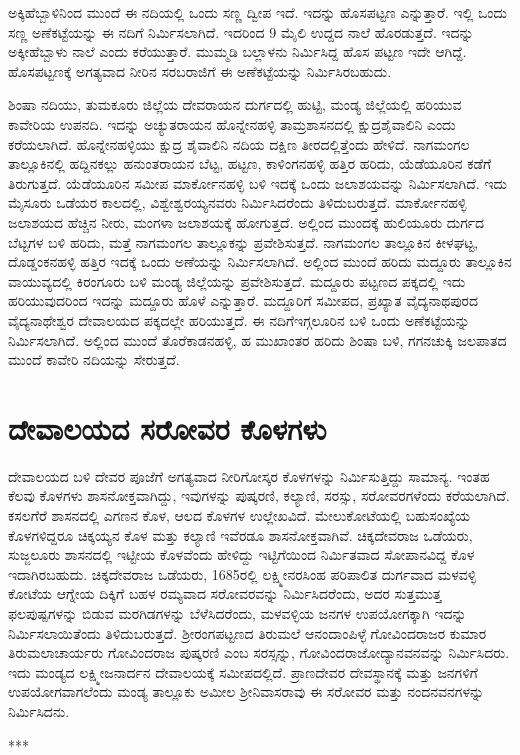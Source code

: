 ಅಕ್ಕಿಹೆಬ್ಬಾಳಿನಿಂದ ಮುಂದೆ ಈ ನದಿಯಲ್ಲಿ ಒಂದು ಸಣ್ಣ ದ್ವೀಪ ಇದೆ. ಇದನ್ನು ಹೊಸಪಟ್ಟಣ ಎನ್ನುತ್ತಾರೆ. ಇಲ್ಲಿ ಒಂದು ಸಣ್ಣ ಅಣೆಕಟ್ಟೆಯನ್ನು ಈ ನದಿಗೆ ನಿರ್ಮಿಸಲಾಗಿದೆ. ಇದರಿಂದ 9 ಮೈಲಿ ಉದ್ದದ ನಾಲೆ ಹೊರಡುತ್ತದೆ. ಇದನ್ನು ಅಕ್ಕೀಹೆಬ್ಬಾಳು ನಾಲೆ ಎಂದು ಕರೆಯುತ್ತಾರೆ. ಮುಮ್ಮಡಿ ಬಲ್ಲಾಳನು ನಿರ್ಮಿಸಿದ್ದ ಹೊಸ ಪಟ್ಟಣ ಇದೇ ಆಗಿದ್ದೆ. ಹೊಸಪಟ್ಟಣಕ್ಕೆ ಅಗತ್ಯವಾದ ನೀರಿನ ಸರಬರಾಜಿಗೆ ಈ ಅಣೆಕಟ್ಟೆಯನ್ನು ನಿರ್ಮಿಸಿರಬಹುದು.

ಶಿಂಷಾ ನದಿಯು, ತುಮಕೂರು ಜಿಲ್ಲೆಯ ದೇವರಾಯನ ದುರ್ಗದಲ್ಲಿ ಹುಟ್ಟಿ, ಮಂಡ್ಯ ಜಿಲ್ಲೆಯಲ್ಲಿ ಹರಿಯುವ ಕಾವೇರಿಯ ಉಪನದಿ. ಇದನ್ನು ಅಚ್ಯುತರಾಯನ ಹೊನ್ನೇನಹಳ್ಳಿ ತಾಮ್ರಶಾಸನದಲ್ಲಿ ಕ್ಷುದ್ರಶೈವಾಲಿನಿ ಎಂದು ಕರೆಯಲಾಗಿದೆ. ಹೊನ್ನೇನಹಳ್ಳಿಯು ಕ್ಷುದ್ರ ಶೈವಾಲಿನಿ ನದಿಯ ದಕ್ಷಿಣ ತೀರದಲ್ಲಿತ್ತೆಂದು ಹೇಳಿದೆ. ನಾಗಮಂಗಲ ತಾಲ್ಲೂಕಿನಲ್ಲಿ ಹದ್ದಿನಕಲ್ಲು ಹನುಂತರಾಯನ ಬೆಟ್ಟ, ಹಟ್ಟಣ, ಕಾಳಿಂಗನಹಳ್ಳಿ ಹತ್ತಿರ ಹರಿದು, ಯೆಡೆಯೂರಿನ ಕಡೆಗೆ ತಿರುಗುತ್ತದೆ. ಯೆಡೆಯೂರಿನ ಸಮೀಪ ಮಾರ್ಕೋನಹಳ್ಳಿ ಬಳಿ ಇದಕ್ಕೆ ಒಂದು ಜಲಾಶಯವನ್ನು ನಿರ್ಮಿಸಲಾಗಿದೆ. ಇದು ಮೈಸೂರು ಒಡೆಯರ ಕಾಲದಲ್ಲಿ, ವಿಶ್ವೇಶ್ವರಯ್ಯನವರು ನಿರ್ಮಿಸಿದರೆಂದು ತಿಳಿದುಬರುತ್ತದೆ. ಮಾರ್ಕೋನಹಳ್ಳಿ ಜಲಾಶಯದ ಹೆಚ್ಚಿನ ನೀರು, ಮಂಗಳಾ ಜಲಾಶಯಕ್ಕೆ ಹೋಗುತ್ತದೆ. ಅಲ್ಲಿಂದ ಮುಂದಕ್ಕೆ ಹುಲಿಯೂರು ದುರ್ಗದ ಬೆಟ್ಟಗಳ ಬಳಿ ಹರಿದು, ಮತ್ತೆ ನಾಗಮಂಗಲ ತಾಲ್ಲೂಕನ್ನು ಪ್ರವೇಶಿಸುತ್ತದೆ. ನಾಗಮಂಗಲ ತಾಲ್ಲೂಕಿನ ಕೀಳಘಟ್ಟ, ದೊಡ್ಡಂಕನಹಳ್ಳಿ ಹತ್ತಿರ ಇದಕ್ಕೆ ಒಂದು ಅಣೆಯನ್ನು ನಿರ್ಮಿಸಲಾಗಿದೆ. ಅಲ್ಲಿಂದ ಮುಂದೆ ಹರಿದು ಮದ್ದೂರು ತಾಲ್ಲೂಕಿನ ವಾಯುವ್ಯದಲ್ಲಿ ಕಿರಂಗೂರು ಬಳಿ ಮಂಡ್ಯ ಜಿಲ್ಲೆಯನ್ನು ಪ್ರವೇಶಿಸುತ್ತದೆ. ಮದ್ದೂರು ಪಟ್ಟಣದ ಪಕ್ಕದಲ್ಲಿ ಇದು ಹರಿಯುವುದರಿಂದ ಇದನ್ನು ಮದ್ದೂರು ಹೊಳೆ ಎನ್ನುತ್ತಾರೆ. ಮದ್ದೂರಿಗೆ ಸಮೀಪದ, ಪ್ರಖ್ಯಾತ ವೈದ್ಯನಾಥಪುರದ ವೈದ್ಯನಾಥೇಶ್ವರ ದೇವಾಲಯದ ಪಕ್ಕದಲ್ಲೇ ಹರಿಯುತ್ತದೆ. ಈ ನದಿಗೆ\break ಇಗ್ಗಲೂರಿನ ಬಳಿ ಒಂದು ಅಣೆಕಟ್ಟೆಯನ್ನು ನಿರ್ಮಿಸಲಾಗಿದೆ. ಅಲ್ಲಿಂದ ಮುಂದೆ ತೊರೆಕಾಡನಹಳ್ಳಿ, ಹ ಮುಖಾಂತರ ಹರಿದು ಶಿಂಷಾ ಬಳಿ, ಗಗನಚುಕ್ಕಿ ಜಲಪಾತದ ಮುಂದೆ ಕಾವೇರಿ ನದಿಯನ್ನು ಸೇರುತ್ತದೆ.


\section{ದೇವಾಲಯದ ಸರೋವರ ಕೊಳಗಳು}

ದೇವಾಲಯದ ಬಳಿ ದೇವರ ಪೂಜೆಗೆ ಅಗತ್ಯವಾದ ನೀರಿಗೋಸ್ಕರ ಕೊಳಗಳನ್ನು ನಿರ್ಮಿಸುತ್ತಿದ್ದು ಸಾಮಾನ್ಯ. ಇಂತಹ ಕೆಲವು ಕೊಳಗಳು ಶಾಸನೋಕ್ತವಾಗಿದ್ದು, ಇವುಗಳನ್ನು ಪುಷ್ಕರಣಿ, ಕಲ್ಯಾಣಿ, ಸರಸ್ಸು, ಸರೋವರಗಳೆಂದು ಕರೆಯಲಾಗಿದೆ. ಕಸಲಗೆರೆ ಶಾಸನದಲ್ಲಿ ಎಗಣನ ಕೊಳ, ಆಲದ ಕೊಳಗಳ ಉಲ್ಲೇಖವಿದೆ. ಮೇಲುಕೋಟೆಯಲ್ಲಿ ಬಹುಸಂಖ್ಯೆಯ ಕೊಳಗಳಿದ್ದರೂ ಚಿಕ್ಕಯ್ಯನ ಕೊಳ ಮತ್ತು ಕಲ್ಯಾಣಿ ಇವೆರಡೂ ಶಾಸನೋಕ್ತವಾಗಿವೆ. ಚಿಕ್ಕದೇವರಾಜ ಒಡೆಯರು, ಸುಜ್ಜಲೂರು ಶಾಸನದಲ್ಲಿ ಇಟ್ಟೀಯ ಕೊಳವೆಂದು ಹೇಳಿದ್ದು ಇಟ್ಟಿಗೆಯಿಂದ ನಿರ್ಮಿತವಾದ ಸೋಪಾನವಿದ್ದ ಕೊಳ ಇದಾಗಿರಬಹುದು. ಚಿಕ್ಕದೇವರಾಜ ಒಡೆಯರು, 1685ರಲ್ಲಿ ಲಕ್ಷ್ಮೀನರಸಿಂಹ ಪರಿಪಾಲಿತ ದುರ್ಗವಾದ ಮಳವಳ್ಳಿ ಕೋಟೆಯ ಆಗ್ನೇಯ ದಿಕ್ಕಿಗೆ ಬಹಳ ರಮ್ಯವಾದ ಸರೋವರವನ್ನು ನಿರ್ಮಿಸಿದರೆಂದು, ಅದರ ಸುತ್ತಮುತ್ತ ಫಲಪುಷ್ಪಗಳನ್ನು ಬಿಡುವ ಮರಗಿಡಗಳನ್ನು ಬೆಳೆಸಿದರೆಂದು, ಮಳವಳ್ಳಿಯ ಜನಗಳ ಉಪಯೋಗಕ್ಕಾಗಿ ಇದನ್ನು ನಿರ್ಮಿಸಲಾಯಿತೆಂದು ತಿಳಿದುಬರುತ್ತದೆ. ಶ‍್ರೀರಂಗಪಟ್ಟಣದ ತಿರುಮಲೆ ಆನಂದಾಂಪಿಳ್ಳೆ ಗೋವಿಂದರಾಜರ ಕುಮಾರ ತಿರುಮಲಾಚಾರ್ಯರು ಗೋವಿಂದರಾಜ ಪುಷ್ಕರಣಿ ಎಂಬ ಸರಸ್ಸನ್ನು, ಗೋವಿಂದರಾಜೋದ್ಯಾನವನವನ್ನು ನಿರ್ಮಿಸಿದರು. ಇದು ಮಂಡ್ಯದ ಲಕ್ಷ್ಮೀಜನಾರ್ದನ ದೇವಾಲಯಕ್ಕೆ ಸಮೀಪದಲ್ಲಿದೆ. ಪ್ರಾಣದೇವರ ದೇವಸ್ಥಾನಕ್ಕೆ ಮತ್ತು ಜನಗಳಿಗೆ ಉಪಯೋಗವಾಗಲೆಂದು ಮಂಡ್ಯ ತಾಲ್ಲೂಕು ಅಮೀಲ ಶ‍್ರೀನಿವಾಸರಾವು ಈ ಸರೋವರ ಮತ್ತು ನಂದನವನಗಳನ್ನು ನಿರ್ಮಿಸಿದನು.

\begin{center}
***
\end{center}

\theendnotes

